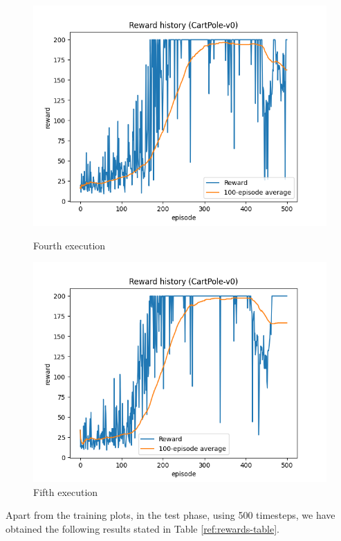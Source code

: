 \documentclass[12pt]{article}
\begin{document}
\begin{figure}[ht]
    \centering
   \begin{minipage}{0.48\textwidth}
     \centering
     \includegraphics[width=0.68\linewidth]{exercise-1/report/img/task-2-v4.png}
     \caption{Fourth execution}
     \label{fig:task-2-v4}
   \end{minipage}\hfill
   \begin{minipage}{0.48\textwidth}
     \centering
     \includegraphics[width=0.68\linewidth]{exercise-1/report/img/task-2-v5.png}
     \caption{Fifth execution}
     \label{fig:task-2-v5}
   \end{minipage}
\end{figure}


Apart from the training plots, in the test phase, using 500 timesteps, we have obtained the following results stated in Table \ref{ref:rewards-table}.
\end{document}
